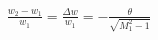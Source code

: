 \documentclass[10pt]{article}
\begin{document}
\begin{align*}\frac{w_{2}-w_{1}}{w_{1}} 
=
\frac{\Delta w}{w_{1}}
=
- \frac{ \theta }{\sqrt{M_{1}^{2} - 1}}\end{align*}
\end{document}
